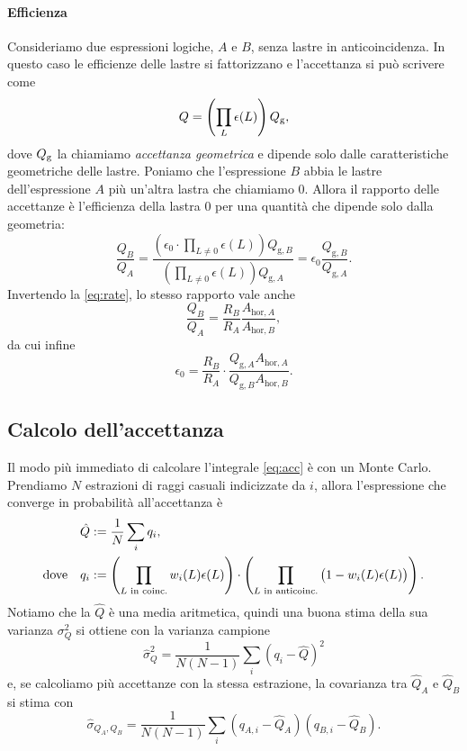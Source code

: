 \paragraph{Efficienza}

Consideriamo due espressioni logiche, $A$ e $B$, senza lastre in anticoincidenza.
In questo caso le efficienze delle lastre si fattorizzano e l'accettanza si può scrivere come
\begin{equation*}
	Q = \left( \prod_L \epsilon(L) \right) Q_\text g,
\end{equation*}
dove $Q_\text g$ la chiamiamo \emph{accettanza geometrica}
e dipende solo dalle caratteristiche geometriche delle lastre.
Poniamo che l'espressione $B$ abbia le lastre dell'espressione $A$ più un'altra lastra che chiamiamo $0$.
Allora il rapporto delle accettanze è l'efficienza della lastra $0$ per una quantità che dipende solo dalla geometria:
\begin{equation*}
	\frac{Q_B}{Q_A} = \frac
	{\left( \epsilon_0 \cdot \prod_{L\neq 0} \epsilon(L) \right) Q_{\text{g},B}}
	{\left( \prod_{L\neq 0} \epsilon(L) \right) Q_{\text{g},A}}
	= \epsilon_0 \frac{Q_{\text{g},B}}{Q_{\text{g},A}}.
\end{equation*}
Invertendo la \eqref{eq:rate}, lo stesso rapporto vale anche
\begin{equation*}
	\frac{Q_B}{Q_A} = \frac{R_B}{R_A} \frac{A_{\text{hor},A}}{A_{\text{hor},B}},
\end{equation*}
da cui infine
\begin{equation*}
	\epsilon_0 = \frac{R_B}{R_A} \cdot \frac{Q_{\text{g},A} A_{\text{hor},A}}{Q_{\text{g},B} A_{\text{hor},B}}.
\end{equation*}

\subsection{Calcolo dell'accettanza}

Il modo più immediato di calcolare l'integrale \eqref{eq:acc} è con un Monte Carlo.
Prendiamo $N$ estrazioni di raggi casuali indicizzate da $i$,
allora l'espressione che converge in probabilità all'accettanza è
\begin{align}
	\label{eq:accmc}
	\hat Q &:= \frac1N \sum_i q_i, \\
	\text{dove}\quad q_i &:=
	\left( \prod_\text{$L$ in coinc.} w_i(L) \epsilon(L) \right)
	\cdot \left( \prod_\text{$L$ in anticoinc.} \big(1 - w_i(L) \epsilon(L)\big) \right). \notag
\end{align}
Notiamo che la $\hat Q$ è una media aritmetica,
quindi una buona stima della sua varianza $\sigma_Q^2$ si ottiene con la varianza campione
\begin{equation*}
	\hat\sigma_Q^2
	= \frac1{N(N-1)} \sum_i (q_i - \hat Q)^2
\end{equation*}
e, se calcoliamo più accettanze con la stessa estrazione,
la covarianza tra $\hat Q_A$ e $\hat Q_B$ si stima con
\begin{equation*}
	\hat\sigma_{Q_A,Q_B}
	= \frac1{N(N-1)} \sum_i (q_{A,i} - \hat Q_A) (q_{B,i} - \hat Q_B).
\end{equation*}

